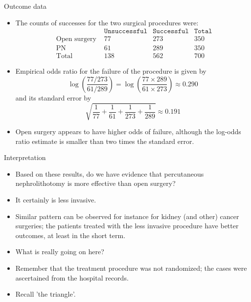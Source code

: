 \documentclass[10pt,handout]{beamer}\usepackage[]{graphicx}\usepackage[]{color}
\begin{document}
\begin{frame}{Outcome data}
\begin{itemize}
	\item The counts of successes for the two surgical procedures were:
	$$
	\begin{array}{lccc}
	                       &\texttt{Unsuccessful}& \texttt{Successful}& \texttt{Total}\\
	\text { Open surgery } & 77 & 273 & 350 \\
	\text { PN } & 61 & 289 & 350 \\
	\text { Total } & 138 & 562 & 700
	\end{array}
	$$
	\item  Empirical odds ratio for the failure of the procedure is given by
	$$
	\log \left(\frac{77 / 273}{61 / 289}\right)=\log \left(\frac{77 \times 289}{61 \times 273}\right) \approx 0.290
	$$
	and its standard error by
	$$
	\sqrt{\frac{1}{77}+\frac{1}{61}+\frac{1}{273}+\frac{1}{289}} \approx 0.191
	$$
	\item Open surgery appears to have higher odds of failure, although the log-odds ratio estimate is smaller than two times the standard error.
\end{itemize}
\end{frame}


\begin{frame}{Interpretation}
\begin{itemize}
	\item Based on these results, do we have evidence that percutaneous nephrolithotomy is more effective than open surgery?
	\item It certainly is less invasive.
	\item Similar pattern can be observed for instance for kidney (and other) cancer surgeries; the patients treated with the less invasive procedure have better outcomes, at least in the short term.
	\item  What is really going on here?
	\item  Remember that the treatment procedure was not randomized; the cases were ascertained from the hospital records.
	\item  Recall 'the triangle'.
\end{itemize}
\end{frame}
\end{document}
